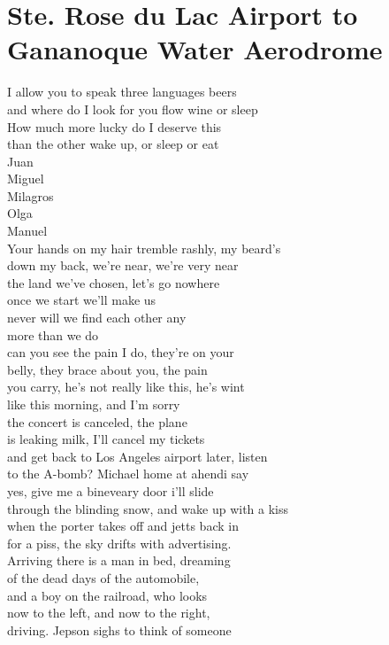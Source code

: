 \documentclass[smalldemyvopaper,11pt,twoside,onecolumn,openright,extrafontsizes]{memoir}
\begin{document}
\chapter{Ste. Rose du Lac Airport to Gananoque Water Aerodrome}
I allow you to speak three languages beers
\\and where do I look for you flow wine or sleep
\\How much more lucky do I deserve this
\\than the other wake up, or sleep or eat
\\Juan
\\Miguel
\\Milagros
\\Olga
\\Manuel
\\Your hands on my hair tremble rashly, my beard's
\\down my back, we're near, we're very near
\\the land we've chosen, let's go nowhere
\\once we start we'll make us
\\never will we find each other any
\\more than we do
\\can you see the pain I do, they're on your
\\belly, they brace about you, the pain
\\you carry, he's not really like this, he's wint
\\like this morning, and I'm sorry
\\the concert is canceled, the plane
\\is leaking milk, I'll cancel my tickets
\\and get back to Los Angeles airport later, listen
\\to the A-bomb? Michael home at ahendi say
\\yes, give me a bineveary door i'll slide
\\through the blinding snow, and wake up with a kiss
\\when the porter takes off and jetts back in
\\for a piss, the sky drifts with advertising.
\\Arriving there is a man in bed, dreaming
\\of the dead days of the automobile,
\\and a boy on the railroad, who looks
\\now to the left, and now to the right,
\\driving. Jepson sighs to think of someone
\end{document}
